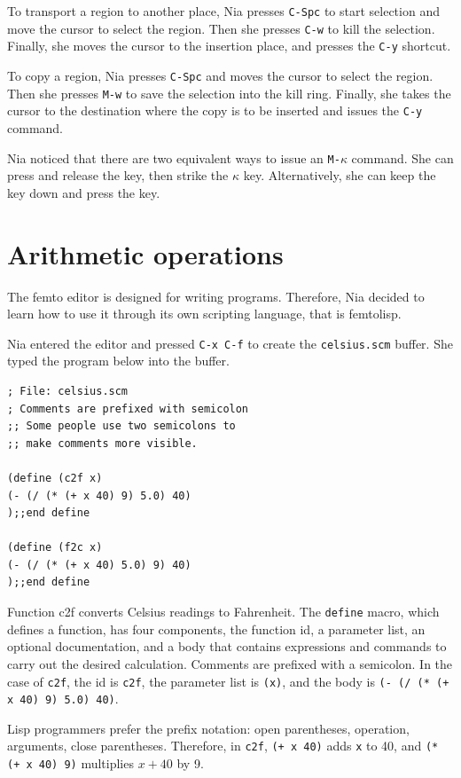 \documentclass[a4paper,12pt]{book}
\begin{document}
To transport a region to another place, Nia presses \verb|C-Spc| to start selection and move the cursor to select the region. Then she presses \verb|C-w| to kill the selection. Finally, she moves the cursor to the insertion place, and presses the \verb|C-y| shortcut.

To copy a region, Nia presses \verb|C-Spc| and moves the cursor to select the region. Then she presses \verb|M-w| to save the selection into the kill ring. Finally, she takes the cursor to the destination where the copy is to be inserted and issues the \verb|C-y| command.

Nia noticed that there are two equivalent ways to
issue an \verb|M-|$\kappa$ command. She can
press and release the  key, then
strike the  $\kappa$ key. Alternatively, she
can keep the  key down and press
the \keys{$\kappa$} key.


\chapter{Arithmetic operations}
The femto editor is designed for writing programs.
Therefore, Nia decided
to learn how to use it through its own scripting language,
that is femtolisp.

Nia entered the editor and pressed \verb|C-x C-f| 
to create the \verb|celsius.scm| buffer. 
She typed the  program below into the buffer. 
\begin{verbatim}
; File: celsius.scm
; Comments are prefixed with semicolon
;; Some people use two semicolons to
;; make comments more visible.

(define (c2f x)
(- (/ (* (+ x 40) 9) 5.0) 40)
);;end define

(define (f2c x)
(- (/ (* (+ x 40) 5.0) 9) 40)
);;end define
\end{verbatim}
Function c2f converts Celsius readings to Fahrenheit.
The \verb|define| macro, which defines a function, 
has four components, the function id, a parameter list,
an optional documentation, and a body that contains
expressions and commands to carry out the desired
calculation. Comments are prefixed with a semicolon.
In the case of \verb|c2f|, the id is \verb|c2f|,
the parameter list is \verb|(x)|, and the body 
is \verb|(- (/ (* (+ x 40) 9) 5.0) 40)|.

Lisp programmers prefer the prefix notation:
open parentheses, operation, arguments, close parentheses.
Therefore, in  \verb|c2f|,  \verb|(+ x 40)|
adds \verb|x| to 40, and \verb|(* (+ x 40) 9)| multiplies $x+40$ by 9.
\end{document}
